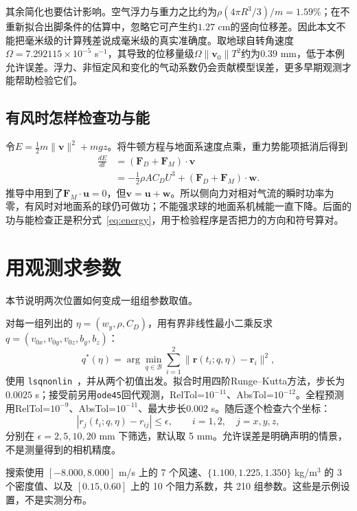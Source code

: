 \documentclass[11pt,a4paper,UTF8,fontset=windows]{ctexart}
\begin{document}
其余简化也要估计影响。空气浮力与重力之比约为$\rho(4\pi R^3/3)/m=1.59\%$；在不重新拟合出脚条件的估算中，忽略它可产生约$1.27$ cm的竖向位移差。因此本文不能把毫米级的计算残差说成毫米级的真实准确度。取地球自转角速度$\Omega=7.292115\times10^{-5}$ s$^{-1}$，其导致的位移量级$\Omega\|\mathbf v_0\|T^2$约为$0.39$ mm，低于本例允许误差。浮力、非恒定风和变化的气动系数仍会贡献模型误差，更多早期观测才能帮助检验它们。
\subsection{有风时怎样检查功与能}
令$E=\tfrac12m\|\mathbf v\|^2+mgz$。将牛顿方程与地面系速度点乘，重力势能项抵消后得到
\begin{align}
\frac{dE}{dt}&=(\mathbf F_D+\mathbf F_M)\cdot\mathbf v\label{eq:energy}\\
&=-\tfrac12\rho AC_DU^3+(\mathbf F_D+\mathbf F_M)\cdot\mathbf w.\nonumber
\end{align}
推导中用到了$\mathbf F_M\cdot\mathbf u=0$，但$\mathbf v=\mathbf u+\mathbf w$。所以侧向力对相对气流的瞬时功率为零，有风时对地面系的球仍可做功；不能强求球的地面系机械能一直下降。后面的功与能检查正是积分式~\eqref{eq:energy}，用于检验程序是否把力的方向和符号算对。


\section{用观测求参数}
本节说明两次位置如何变成一组组参数取值。

对每一组列出的 $\eta=(w_y,\rho,C_D)$，用有界非线性最小二乘反求 $q=(v_{0x},v_{0y},v_{0z},b_y,b_z)$：
\begin{equation}
q^*(\eta)=\arg\min_{q\in\mathcal B}\sum_{i=1}^{2}
\|\mathbf r(t_i;q,\eta)-\mathbf r_i\|^2,
\label{eq:fit}
\end{equation}
使用 \texttt{lsqnonlin}~\cite{lsq}，并从两个初值出发。拟合时用四阶Runge--Kutta方法，步长为$0.0025$ s；接受前另用\texttt{ode45}回代观测，RelTol=$10^{-11}$、AbsTol=$10^{-12}$。全程预测用RelTol=$10^{-9}$、AbsTol=$10^{-11}$、最大步长$0.002$ s。随后逐个检查六个坐标：
\begin{equation}
|r_j(t_i;q,\eta)-r_{ij}|\le\epsilon,
\qquad i=1,2,\quad j=x,y,z,
\label{eq:tol}
\end{equation}
分别在 $\epsilon=2,5,10,20$ mm 下筛选，默认取 5 mm。允许误差是明确声明的情景，不是测量得到的相机精度。

搜索使用 $[-8.000,8.000]$ m/s 上的 7 个风速、$\{1.100, 1.225, 1.350\}$ kg/m$^3$ 的 3 个密度值、以及 $[0.15,0.60]$ 上的 10 个阻力系数，共 210 组参数。这些是示例设置，不是实测分布。
\end{document}
